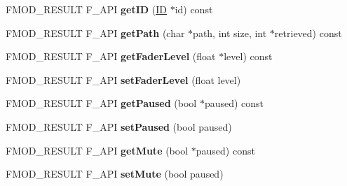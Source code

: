 \begin{DoxyCompactItemize}
\item 
\hypertarget{class_f_m_o_d_1_1_studio_1_1_bus_a847d1ef4749d6273861407646632897d}{F\+M\+O\+D\+\_\+\+R\+E\+S\+U\+L\+T F\+\_\+\+A\+P\+I {\bfseries get\+I\+D} (\hyperlink{struct_f_m_o_d___g_u_i_d}{I\+D} $\ast$id) const }\label{class_f_m_o_d_1_1_studio_1_1_bus_a847d1ef4749d6273861407646632897d}

\item 
\hypertarget{class_f_m_o_d_1_1_studio_1_1_bus_ae50769537b3686dd501a8f1c23c5f4c9}{F\+M\+O\+D\+\_\+\+R\+E\+S\+U\+L\+T F\+\_\+\+A\+P\+I {\bfseries get\+Path} (char $\ast$path, int size, int $\ast$retrieved) const }\label{class_f_m_o_d_1_1_studio_1_1_bus_ae50769537b3686dd501a8f1c23c5f4c9}

\item 
\hypertarget{class_f_m_o_d_1_1_studio_1_1_bus_aade15ea678a9241bfc72d3708d3c1824}{F\+M\+O\+D\+\_\+\+R\+E\+S\+U\+L\+T F\+\_\+\+A\+P\+I {\bfseries get\+Fader\+Level} (float $\ast$level) const }\label{class_f_m_o_d_1_1_studio_1_1_bus_aade15ea678a9241bfc72d3708d3c1824}

\item 
\hypertarget{class_f_m_o_d_1_1_studio_1_1_bus_a12dad1046a258a5a032c5ea7389c723b}{F\+M\+O\+D\+\_\+\+R\+E\+S\+U\+L\+T F\+\_\+\+A\+P\+I {\bfseries set\+Fader\+Level} (float level)}\label{class_f_m_o_d_1_1_studio_1_1_bus_a12dad1046a258a5a032c5ea7389c723b}

\item 
\hypertarget{class_f_m_o_d_1_1_studio_1_1_bus_aed1f7ccac31cf6123162f18a2323b0fb}{F\+M\+O\+D\+\_\+\+R\+E\+S\+U\+L\+T F\+\_\+\+A\+P\+I {\bfseries get\+Paused} (bool $\ast$paused) const }\label{class_f_m_o_d_1_1_studio_1_1_bus_aed1f7ccac31cf6123162f18a2323b0fb}

\item 
\hypertarget{class_f_m_o_d_1_1_studio_1_1_bus_a082c38979aaaf168513b1285aed2aa2f}{F\+M\+O\+D\+\_\+\+R\+E\+S\+U\+L\+T F\+\_\+\+A\+P\+I {\bfseries set\+Paused} (bool paused)}\label{class_f_m_o_d_1_1_studio_1_1_bus_a082c38979aaaf168513b1285aed2aa2f}

\item 
\hypertarget{class_f_m_o_d_1_1_studio_1_1_bus_a904b9e7a5388ea0d9348a029da9e3009}{F\+M\+O\+D\+\_\+\+R\+E\+S\+U\+L\+T F\+\_\+\+A\+P\+I {\bfseries get\+Mute} (bool $\ast$paused) const }\label{class_f_m_o_d_1_1_studio_1_1_bus_a904b9e7a5388ea0d9348a029da9e3009}

\item 
\hypertarget{class_f_m_o_d_1_1_studio_1_1_bus_aaafd3a4f3a2b95560150665d48a237e1}{F\+M\+O\+D\+\_\+\+R\+E\+S\+U\+L\+T F\+\_\+\+A\+P\+I {\bfseries set\+Mute} (bool paused)}\label{class_f_m_o_d_1_1_studio_1_1_bus_aaafd3a4f3a2b95560150665d48a237e1}


\end{DoxyCompactItemize}
